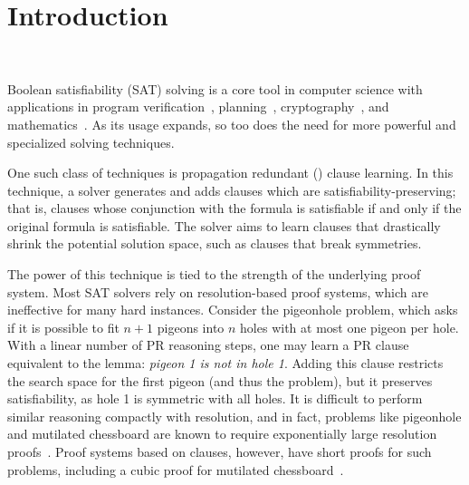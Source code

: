 \section{Introduction}~\label{sec:intro}


Boolean satisfiability (SAT) solving is a core tool in computer science with applications in program verification~\cite{BillionQueries,sat-hardwareverification,ic3,bmc}, planning~\cite{planning,planningassat}, cryptography~\cite{cryptominisat}, and mathematics~\cite{chromaticnumber,pythagoreantriples,kellersconjecture,emptyhexagon}. As its usage expands, so too does the need for more powerful and specialized solving techniques.



One such class of techniques is propagation redundant (\pr) clause learning. In this technique, a solver generates and adds clauses which are satisfiability-preserving; that is, clauses whose conjunction with the formula is satisfiable if and only if the original formula is satisfiable. The solver aims to learn clauses that drastically shrink the potential solution space, such as clauses that break symmetries.




The power of this technique is tied to the strength of the underlying proof system. Most SAT solvers rely on resolution-based proof systems, which are ineffective for many hard instances. 
Consider the pigeonhole problem, which asks if it is possible to fit $n+1$ pigeons into $n$ holes with at most one pigeon per hole. With a linear number of PR reasoning steps, one may learn a PR clause equivalent to the lemma: \emph{pigeon 1 is not in hole 1}. Adding this clause restricts the search space for the first pigeon (and thus the problem), but it preserves satisfiability, as hole 1 is symmetric with all holes. 
It is difficult to perform similar reasoning compactly with resolution, and in fact, problems like pigeonhole and mutilated chessboard are known to require exponentially large resolution proofs~\cite{hakenpigeonhole,mutilatedchessboard-exponential}. Proof systems based on \pr clauses, however, have short proofs for such problems, including a cubic proof for mutilated chessboard~\cite{mutilatedchessboard-pr}.

